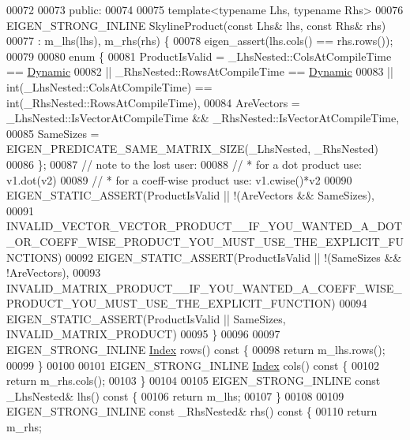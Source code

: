 \begin{DoxyCode}
00072 
00073 \textcolor{keyword}{public}:
00074 
00075     \textcolor{keyword}{template}<\textcolor{keyword}{typename} Lhs, \textcolor{keyword}{typename} Rhs>
00076     EIGEN\_STRONG\_INLINE SkylineProduct(\textcolor{keyword}{const} Lhs& lhs, \textcolor{keyword}{const} Rhs& rhs)
00077     : m\_lhs(lhs), m\_rhs(rhs) \{
00078         eigen\_assert(lhs.cols() == rhs.rows());
00079 
00080         \textcolor{keyword}{enum} \{
00081             ProductIsValid = \_LhsNested::ColsAtCompileTime == \hyperlink{namespace_eigen_ad81fa7195215a0ce30017dfac309f0b2}{Dynamic}
00082             || \_RhsNested::RowsAtCompileTime == \hyperlink{namespace_eigen_ad81fa7195215a0ce30017dfac309f0b2}{Dynamic}
00083             || int(\_LhsNested::ColsAtCompileTime) == int(\_RhsNested::RowsAtCompileTime),
00084             AreVectors = \_LhsNested::IsVectorAtCompileTime && \_RhsNested::IsVectorAtCompileTime,
00085             SameSizes = EIGEN\_PREDICATE\_SAME\_MATRIX\_SIZE(\_LhsNested, \_RhsNested)
00086         \};
00087         \textcolor{comment}{// note to the lost user:}
00088         \textcolor{comment}{//    * for a dot product use: v1.dot(v2)}
00089         \textcolor{comment}{//    * for a coeff-wise product use: v1.cwise()*v2}
00090         EIGEN\_STATIC\_ASSERT(ProductIsValid || !(AreVectors && SameSizes),
00091                 
      INVALID\_VECTOR\_VECTOR\_PRODUCT\_\_IF\_YOU\_WANTED\_A\_DOT\_OR\_COEFF\_WISE\_PRODUCT\_YOU\_MUST\_USE\_THE\_EXPLICIT\_FUNCTIONS)
00092                 EIGEN\_STATIC\_ASSERT(ProductIsValid || !(SameSizes && !AreVectors),
00093                 
      INVALID\_MATRIX\_PRODUCT\_\_IF\_YOU\_WANTED\_A\_COEFF\_WISE\_PRODUCT\_YOU\_MUST\_USE\_THE\_EXPLICIT\_FUNCTION)
00094                 EIGEN\_STATIC\_ASSERT(ProductIsValid || SameSizes, INVALID\_MATRIX\_PRODUCT)
00095     \}
00096 
00097     EIGEN\_STRONG\_INLINE \hyperlink{namespace_eigen_a62e77e0933482dafde8fe197d9a2cfde}{Index} rows()\textcolor{keyword}{ const }\{
00098         \textcolor{keywordflow}{return} m\_lhs.rows();
00099     \}
00100 
00101     EIGEN\_STRONG\_INLINE \hyperlink{namespace_eigen_a62e77e0933482dafde8fe197d9a2cfde}{Index} cols()\textcolor{keyword}{ const }\{
00102         \textcolor{keywordflow}{return} m\_rhs.cols();
00103     \}
00104 
00105     EIGEN\_STRONG\_INLINE \textcolor{keyword}{const} \_LhsNested& lhs()\textcolor{keyword}{ const }\{
00106         \textcolor{keywordflow}{return} m\_lhs;
00107     \}
00108 
00109     EIGEN\_STRONG\_INLINE \textcolor{keyword}{const} \_RhsNested& rhs()\textcolor{keyword}{ const }\{
00110         \textcolor{keywordflow}{return} m\_rhs;

\end{DoxyCode}
